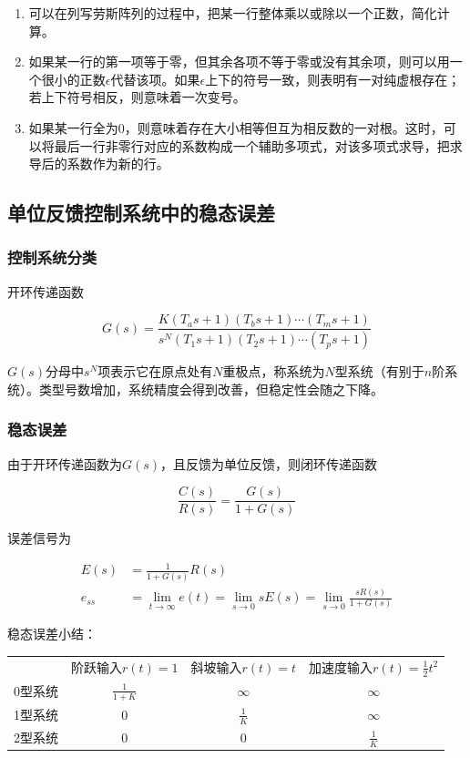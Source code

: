 \begin{enumerate}
	\item	可以在列写劳斯阵列的过程中，把某一行整体乘以或除以一个正数，简化计算。
	\item	如果某一行的第一项等于零，但其余各项不等于零或没有其余项，则可以用一个很小的正数$\epsilon$代替该项。如果$\epsilon$上下的符号一致，则表明有一对纯虚根存在；若上下符号相反，则意味着一次变号。
	\item	如果某一行全为0，则意味着存在大小相等但互为相反数的一对根。这时，可以将最后一行非零行对应的系数构成一个辅助多项式，对该多项式求导，把求导后的系数作为新的行。
\end{enumerate}

\subsection{单位反馈控制系统中的稳态误差}

\subsubsection{控制系统分类}

开环传递函数

\begin{equation*}
G(s)=\frac{K(T_as+1)(T_bs+1)\cdots(T_ms+1)}{s^N(T_1s+1)(T_2s+1)\cdots(T_ps+1)}
\end{equation*}

$G(s)$分母中$s^N$项表示它在原点处有$N$重极点，称系统为$N$型系统（有别于$n$阶系统）。类型号数增加，系统精度会得到改善，但稳定性会随之下降。

\subsubsection{稳态误差}

由于开环传递函数为$G(s)$，且反馈为单位反馈，则闭环传递函数

\begin{equation*}
\frac{C(s)}{R(s)}=\frac{G(s)}{1+G(s)}
\end{equation*}

误差信号为

\begin{align*}
E(s)&=\frac{1}{1+G(s)}R(s)\\
e_{ss}&=\lim_{t\to\infty}e(t)=\lim_{s\to0}sE(s)=\lim_{s\to0}\frac{sR(s)}{1+G(s)}
\end{align*}

稳态误差小结：

\begin{small}
	\begin{tabular}{cccc}
		\centering
			&	阶跃输入$r(t)=1$	&	斜坡输入$r(t)=t$	&	加速度输入$r(t)=\frac12t^2$\\
		0型系统&	$\frac{1}{1+K}$	&$\infty$	&	$\infty$\\
		1型系统&$0$	&$\frac1K$&$\infty$\\
		2型系统&$0$	&$0$	&$\frac1K$
		\end{tabular}
\end{small}





